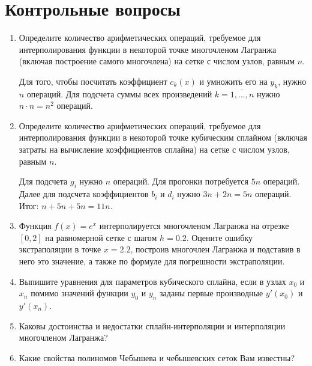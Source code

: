 \documentclass[12pt, a4paper]{article}
\begin{document}
\section{Контрольные вопросы}
\begin{enumerate}

\item Определите количество арифметических операций, требуемое для интерполирования функции в некоторой точке многочленом Лагранжа (включая построение самого многочлена) на сетке с числом узлов, равным $n$.

Для того, чтобы посчитать коэффициент $c_k(x)$ и умножить его на $y_k$, нужно $n$ операций. Для подсчета суммы всех произведений $k = \overline{1,..., n}$ нужно $n \cdot n = n^2$ операций.

\item Определите количество арифметических операций, требуемое для интерполирования функции в некоторой точке кубическим сплайном (включая затраты на вычисление коэффициентов сплайна) на сетке с числом узлов, равным $n$.

Для подсчета $g_i$ нужно $n$ операций. Для прогонки потребуется $5n$ операций. Далее для подсчета коэффициентов $b_i$ и $d_i$ нужно $3n + 2n = 5n$ операций. Итог: $n + 5n + 5n = 11n$.

\item Функция $f(x) = e^x$ интерполируется многочленом Лагранжа на отрезке $[0, 2]$ на равномерной сетке с шагом $h = 0{.}2$. Оцените ошибку экстраполяции в точке $x = 2{.}2$, построив многочлен Лагранжа и подставив в него это значение, а также по формуле для погрешности экстраполяции.

\item Выпишите уравнения для параметров кубического сплайна, если в узлах $x_0$ и $x_n$ помимо значений функции $y_0$ и $y_n$ заданы первые производные $y'(x_0)$ и $y'(x_n)$.

\item Каковы достоинства и недостатки сплайн-интерполяции и интерполяции многочленом Лагранжа?

\item Какие свойства полиномов Чебышева и чебышевских сеток Вам известны?


\end{enumerate}
\newpage
\end{document}
